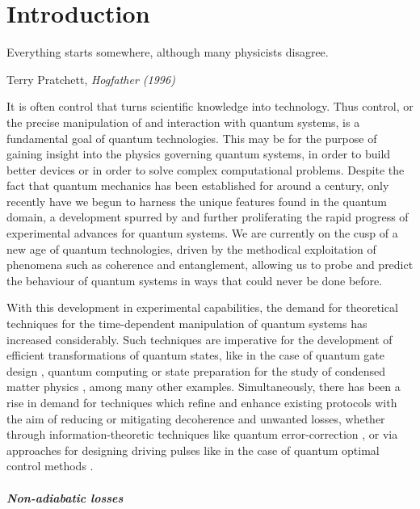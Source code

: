 \chapter{Introduction}

\epigraph{Everything starts somewhere, although many physicists disagree.}{Terry Pratchett, \emph{Hogfather (1996)}}

It is often control that turns scientific knowledge into technology. Thus control, or the precise manipulation of and interaction with quantum systems, is a fundamental goal of quantum technologies. This may be for the purpose of gaining insight into the physics governing quantum systems, in order to build better devices or in order to solve complex computational problems. Despite the fact that quantum mechanics has been established for around a century, only recently have we begun to harness the unique features found in the quantum domain, a development spurred by and further proliferating the rapid progress of experimental advances for quantum systems. We are currently on the cusp of a new age of quantum technologies, driven by the methodical exploitation of phenomena such as coherence and entanglement, allowing us to probe and predict the behaviour of quantum systems in ways that could never be done before. 

With this development in experimental capabilities, the demand for theoretical techniques for the time-dependent manipulation of quantum systems has increased considerably. Such techniques are imperative for the development of efficient transformations of quantum states, like in the case of quantum gate design \cite{pelegri_high-fidelity_2022}, quantum computing \cite{albash_adiabatic_2018} or state preparation for the study of condensed matter physics \cite{dimitrova_many-body_2023}, among many other examples. Simultaneously, there has been a rise in demand for techniques which refine and enhance existing protocols with the aim of reducing or mitigating decoherence and unwanted losses, whether through information-theoretic techniques like quantum error-correction \cite{roffe_quantum_2019}, or via approaches for designing driving pulses like in the case of quantum optimal control methods \cite{glaser_training_2015, koch_quantum_2022}. 

\paragraph*{Non-adiabatic losses}

